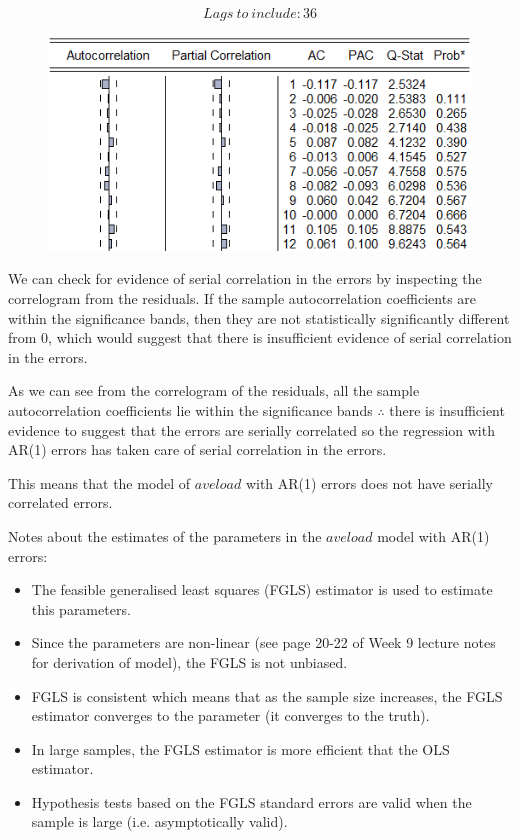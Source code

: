 \documentclass[12pt]{report}
\begin{document}
\vspace{-\baselineskip} $$Lags\ to\ include:36$$ \begin{figure}[H]
	\centerline{\includegraphics{tute10_14}}
\end{figure}
\vspace{-\baselineskip} \noindent We can check for evidence of serial correlation in the errors by inspecting the correlogram from the residuals. If the sample autocorrelation coefficients are within the significance bands, then they are not statistically significantly different from 0, which would suggest that there is insufficient evidence of serial correlation in the errors.

\noindent As we can see from the correlogram of the residuals, all the sample autocorrelation coefficients lie within the significance bands $\therefore$ there is insufficient evidence to suggest that the errors are serially correlated so the regression with AR(1) errors has taken care of serial correlation in the errors.

\noindent This means that the model of $aveload$ with AR(1) errors does not have serially correlated errors.

\noindent Notes about the estimates of the parameters in the $aveload$ model with AR(1) errors:
\begin{itemize}
	\item The feasible generalised least squares (FGLS) estimator is used to estimate this parameters.
	\item Since the parameters are non-linear (see page 20-22 of Week 9 lecture notes for derivation of model), the FGLS is not unbiased.
	\item FGLS is consistent which means that as the sample size increases, the FGLS estimator converges to the parameter (it converges to the truth).
	\item In large samples, the FGLS estimator is more efficient that the OLS estimator.
	\item Hypothesis tests based on the FGLS standard errors are valid when the sample is large (i.e. asymptotically valid).
\end{itemize}
\end{document}
